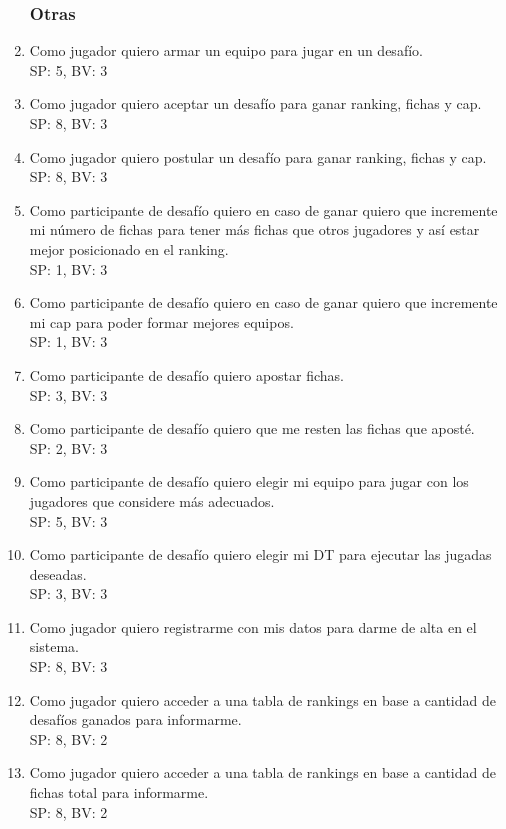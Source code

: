 \documentclass[a4paper, 10pt, twoside]{article}
\begin{document}
\begin{enumerate}
    \subsubsection{Otras}
    \item Como jugador quiero armar un equipo para jugar en un desaf\'io.
    \\SP: 5, BV: 3
    \item Como jugador quiero aceptar un desaf\'io para ganar ranking, fichas y cap.
    \\SP: 8, BV: 3
    \item Como jugador quiero postular un desaf\'io para ganar ranking, fichas y cap.
    \\SP: 8, BV: 3
    \item Como participante de desaf\'io quiero en caso de ganar quiero que incremente mi n\'umero de fichas para tener m\'as fichas que otros jugadores y as\'i estar mejor posicionado en el ranking.
    \\SP: 1, BV: 3
    \item Como participante de desaf\'io quiero en caso de ganar quiero que incremente mi cap para poder formar mejores equipos.
    \\SP: 1, BV: 3
    \item Como participante de desaf\'io quiero apostar fichas.
    \\SP: 3, BV: 3
    \item Como participante de desaf\'io quiero que me resten las fichas que apost\'e.
    \\SP: 2, BV: 3
    \item Como participante de desaf\'io quiero elegir mi equipo para jugar con los jugadores que considere m\'as adecuados.
    \\SP: 5, BV: 3
    \item Como participante de desaf\'io quiero elegir mi DT para ejecutar las jugadas deseadas.
    \\SP: 3, BV: 3
    \item Como jugador quiero registrarme con mis datos para darme de alta en el sistema.
    \\SP: 8, BV: 3
    \item Como jugador quiero acceder a una tabla de rankings en base a cantidad de desaf\'ios ganados para informarme.
    \\SP: 8, BV: 2
    \item Como jugador quiero acceder a una tabla de rankings en base a cantidad de fichas total para informarme.
    \\SP: 8, BV: 2

\end{enumerate}
\end{document}

